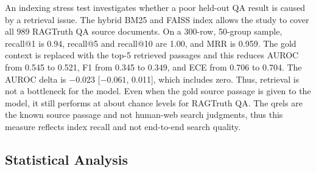 \documentclass[a4paper,fleqn]{cas-sc}
\begin{document}
An indexing stress test investigates whether a poor held-out QA result is caused by a retrieval issue. The hybrid BM25 and FAISS index allows the study to cover all 989 RAGTruth QA source documents. On a 300-row, 50-group sample, recall@1 is 0.94, recall@5 and recall@10 are 1.00, and MRR is 0.959. The gold context is replaced with the top-5 retrieved passages and this reduces AUROC from 0.545 to 0.521, F1 from 0.345 to 0.349, and ECE from 0.706 to 0.704. The AUROC delta is $-$0.023 [$-0.061$, 0.011], which includes zero. Thus, retrieval is not a bottleneck for the model. Even when the gold source passage is given to the model, it still performs at about chance levels for RAGTruth QA. The qrels are the known source passage and not human-web search judgments, thus this measure reflects index recall and not end-to-end search quality.

\subsection{Statistical Analysis}
\end{document}
